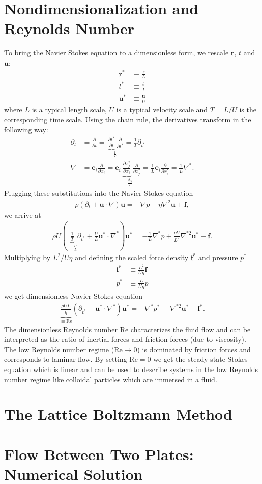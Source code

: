 \documentclass[a4paper,10pt,bibtotoc]{scrartcl}
\begin{document}
\section{Nondimensionalization and Reynolds Number}
To bring the Navier Stokes equation to a dimensionless form, we rescale $\mathbf{r}$, $t$ and $\mathbf{u}$:
\begin{align}
 \mathbf{r}^* & \equiv \frac{\mathbf{r}}{L}\\
 t^* &\equiv \frac{t}{T}\\
 \mathbf{u}^* &\equiv \frac{\mathbf{u}}{U}
\end{align}
where $L$ is a typical length scale, $U$ is a typical velocity scale and $T=L/U$ is the corresponding time scale. Using the chain rule, the derivatives transform in the following way:
\begin{align}
 \partial_t &= \frac{\partial}{\partial t} = \underbrace{\frac{\partial t^*}{\partial t}}_{=\frac{1}{T}} \frac{\partial}{\partial t^*}= \frac{1}{T}\partial_{t^*}\\
 \nabla &= \mathbf{e}_i\frac{\partial}{\partial x_i} = \mathbf{e}_i\underbrace{\frac{\partial x_j^*}{\partial x_i}}_{=\frac{\delta_{ij}}{L}} \frac{\partial}{\partial x_j^*} = \frac{1}{L}\mathbf{e}_i\frac{\partial}{\partial x_i^*} = \frac{1}{L}\nabla^*.
\end{align}
Plugging these substitutions into the Navier Stokes equation
\begin{align}
 \rho\left(\partial_t + \mathbf{u}\cdot \nabla\right)\mathbf{u} = -\nabla p + \eta \nabla ^2 \mathbf{u} + \mathbf{f},
\end{align}
we arrive at
\begin{align}
 \rho U\left(\underbrace{\frac{1}{T}}_{=\frac{U}{L}}\partial_{t^*} + \frac{U}{L}\mathbf{u}^*\cdot \nabla^*\right)\mathbf{u}^* = -\frac{1}{L}\nabla^* p + \frac{\eta U}{L^2} \nabla^{*2} \mathbf{u}^* + \mathbf{f}.
\end{align}
Multiplying by $L^2 / U\eta$ and defining the scaled force density $\mathbf{f}^*$ and pressure $p^*$
\begin{align}
\mathbf{f}^* &\equiv \frac{L^2 }{U \eta}\mathbf{f}\\
p ^* &\equiv \frac{L }{U\eta}p
\end{align}
we get dimensionless Navier Stokes equation
\begin{align}
 \underbrace{\frac{\rho U L}{\eta}}_{\equiv \mathrm{Re}}\left(\partial_{t^*} + \mathbf{u}^*\cdot \nabla^*\right)\mathbf{u}^* = -\nabla^* p^* + \ \nabla^{*2} \mathbf{u}^* + \mathbf{f}^*.
\end{align}
The dimensionless Reynolds number Re characterizes the fluid flow and can be interpreted as the ratio of inertial forces and friction forces (due to viscosity). The low Reynolds number regime ($\mathrm{Re}\rightarrow 0$) is dominated by friction forces and corresponds to laminar flow. By setting $\mathrm{Re}= 0$ we get the steady-state Stokes equation which is linear and can be used to describe systems in the low Reynolds number regime like colloidal particles which are immersed in a fluid.


\section{The Lattice Boltzmann Method}
\section{Flow Between Two Plates: Numerical Solution}
\end{document}
